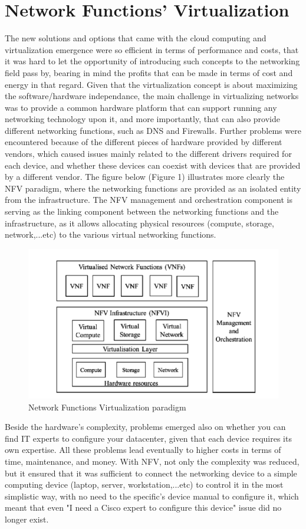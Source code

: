 \section{Network Functions' Virtualization}
The new solutions and options that came with the cloud computing and virtualization emergence were so efficient in terms of performance and costs, that it was hard to let the opportunity of introducing such concepts to the
networking field pass by, bearing in mind the profits that can be made in terms of cost and energy in that regard. Given that the virtualization concept is about maximizing the software/hardware independance, the main challenge in virtualizing networks was to provide a common hardware platform that can support running any networking technology upon it, and more importantly, that can also provide different networking functions, such as DNS and Firewalls. Further problems were encountered because of the different pieces of hardware provided by different 
vendors, which caused issues mainly related to the different drivers required for each device, and whether these devices can coexist with devices that are provided by a different vendor. The figure below (Figure 1) illustrates more clearly the NFV paradigm, where the networking functions are provided as an isolated entity from the infrastructure. The NFV management and orchestration component is serving as the linking component between the networking functions and the infrastructure, as it allows allocating physical resources (compute, storage, network,...etc) to the various virtual networking functions.
\begin{figure}[htp]
    \includegraphics[scale=0.59]{nfv}
    \hspace*{-2.65cm}
    \caption{Network Functions Virtualization paradigm}
\end{figure}
\newpage
Beside the hardware’s complexity, problems emerged also on whether you can find IT experts to configure your datacenter, given that each device requires its own expertise. All these problems lead eventually to higher costs in terms of time, maintenance, and money. With NFV, not only the complexity was reduced, but it ensured that it was sufficient to connect the networking device to a simple computing  device (laptop, server, workstation,...etc) to control it in the most simplistic way, with no need to the specific’s device manual to configure it, which meant that even "I need a Cisco expert to configure this device" issue did no longer exist.
